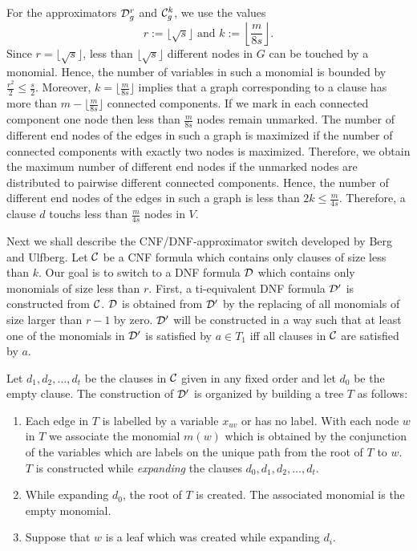 \documentclass[11pt]{article}
\begin{document}
For the approximators ${\cal D}^r_g$ and ${\cal C}^k_g$, we use the values
$$
r := \lfloor \sqrt{s}\rfloor \mbox{ and } k := \left\lfloor \frac{m}{8s}\right\rfloor.
$$
Since $r = \lfloor \sqrt{s}\rfloor$, less than $\lfloor \sqrt{s}\rfloor$ different nodes in $G$ 
can be touched by a monomial. Hence, the number of variables in such a monomial is bounded by
$\frac{r^2}{2} \leq \frac{s}{2}$. Moreover, $k = \lfloor \frac{m}{8s}\rfloor$ implies that a graph corresponding
to a clause has more than $m - \lfloor \frac{m}{8s}\rfloor$ connected components. If we mark in each connected
component one node then less than $\frac{m}{8s}$ nodes remain
unmarked. The number of different end nodes of the edges in such a graph is maximized if the number of connected
components with exactly two nodes is maximized. Therefore, we obtain the maximum number of different end nodes if
the unmarked nodes are distributed to pairwise different connected components. Hence, the number of different end
nodes of the edges in such a graph is less than $2k \leq \frac{m}{4s}$. Therefore, a clause $d$ touchs less than
$\frac{m}{4s}$ nodes in $V$.

Next we shall describe the CNF/DNF-approximator switch developed by Berg and Ulfberg. Let ${\cal C}$ be a CNF formula
which contains only clauses of size less than $k$. Our goal is to switch to a DNF formula ${\cal D}$ which contains
only monomials of size less than $r$. First, a ti-equivalent DNF formula ${\cal D}'$ is constructed from ${\cal C}$.
${\cal D}$ is obtained from ${\cal D}'$ by the replacing of all monomials of size larger than $r-1$ by zero.
${\cal D}'$ will be constructed in a way such that at least one of the monomials in ${\cal D}'$ is satisfied by
$a \in T_1$ iff all clauses in ${\cal C}$ are satisfied by $a$.

Let $d_1,d_2, \ldots,d_t$ be the clauses in ${\cal C}$ given in any fixed order and let $d_0$ be the empty clause.
The construction of ${\cal D}'$ is organized by building a tree $T$ as follows:
\begin{enumerate}
\item
  Each edge in $T$ is labelled by a variable $x_{uv}$ or has no label. With each node $w$ in $T$ we associate the
  monomial $m(w)$ which is obtained by the conjunction of the variables which are labels on the unique path from
  the root of $T$ to $w$. $T$ is constructed while {\em expanding\/} the clauses $d_0,d_1,d_2, \ldots,d_t$.
\item
  While expanding $d_0$, the root of $T$ is created. The associated monomial is the empty monomial.
\item
  Suppose that $w$ is a leaf which was created while expanding $d_i$. 
\end{enumerate}
\end{document}
